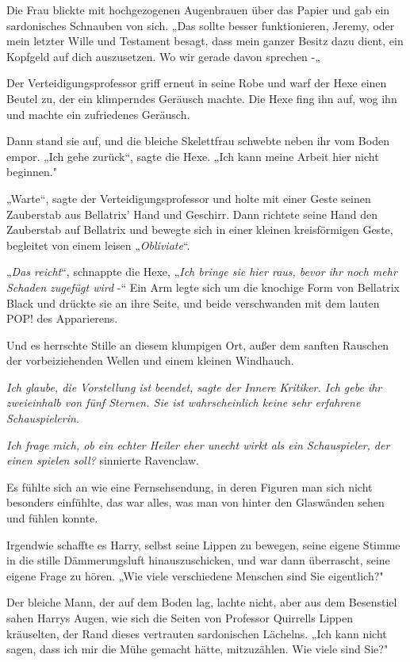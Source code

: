 {Die Frau blickte mit hochgezogenen Augenbrauen über das Papier und gab ein sardonisches Schnauben von sich. „Das sollte besser funktionieren, Jeremy, oder mein letzter Wille und Testament besagt, dass mein ganzer Besitz dazu dient, ein Kopfgeld auf dich auszusetzen. Wo wir gerade davon sprechen -„

Der Verteidigungsprofessor griff erneut in seine Robe und warf der Hexe einen Beutel zu, der ein klimperndes Geräusch machte. Die Hexe fing ihn auf, wog ihn und machte ein zufriedenes Geräusch.

Dann stand sie auf, und die bleiche Skelettfrau schwebte neben ihr vom Boden empor. „Ich gehe zurück“, sagte die Hexe. „Ich kann meine Arbeit hier nicht beginnen."

„Warte“, sagte der Verteidigungsprofessor und holte mit einer Geste seinen Zauberstab aus Bellatrix' Hand und Geschirr. Dann richtete seine Hand den Zauberstab auf Bellatrix und bewegte sich in einer kleinen kreisförmigen Geste, begleitet von einem leisen „\emph{Obliviate}“.

„\emph{Das reicht}“, schnappte die Hexe, „\emph{Ich bringe sie hier raus, bevor ihr noch mehr Schaden zugefügt wird} -“ Ein Arm legte sich um die knochige Form von Bellatrix Black und drückte sie an ihre Seite, und beide verschwanden mit dem lauten POP! des Apparierens.

Und es herrschte Stille an diesem klumpigen Ort, außer dem sanften Rauschen der vorbeiziehenden Wellen und einem kleinen Windhauch.

\emph{\emph{Ich glaube, die Vorstellung ist beendet}, sagte der Innere Kritiker. I\emph{ch gebe ihr zweieinhalb von fünf Sternen. Sie ist wahrscheinlich keine sehr erfahrene Schauspielerin.}}

\emph{Ich frage mich, ob ein echter Heiler eher unecht wirkt als ein Schauspieler, der einen spielen soll?} sinnierte Ravenclaw.

Es fühlte sich an wie eine Fernsehsendung, in deren Figuren man sich nicht besonders einfühlte, das war alles, was man von hinter den Glaswänden sehen und fühlen konnte.

Irgendwie schaffte es Harry, selbst seine Lippen zu bewegen, seine eigene Stimme in die stille Dämmerungsluft hinauszuschicken, und war dann überrascht, seine eigene Frage zu hören. „Wie viele verschiedene Menschen sind Sie eigentlich?"

Der bleiche Mann, der auf dem Boden lag, lachte nicht, aber aus dem Besenstiel sahen Harrys Augen, wie sich die Seiten von Professor Quirrells Lippen kräuselten, der Rand dieses vertrauten sardonischen Lächelns. „Ich kann nicht sagen, dass ich mir die Mühe gemacht hätte, mitzuzählen. Wie viele sind Sie?"

}
